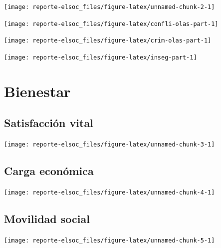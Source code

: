 \documentclass[
  12pt,
]{book}
\begin{document}
\begin{center}\texttt{[image: reporte-elsoc\_files/figure-latex/unnamed-chunk-2-1]} \end{center}

\begin{center}\texttt{[image: reporte-elsoc\_files/figure-latex/confli-olas-part-1]} \end{center}

\begin{center}\texttt{[image: reporte-elsoc\_files/figure-latex/crim-olas-part-1]} \end{center}

\begin{center}\texttt{[image: reporte-elsoc\_files/figure-latex/inseg-part-1]} \end{center}

\hypertarget{bienestar}{%
\section{Bienestar}\label{bienestar}}

\hypertarget{satisfacciuxf3n-vital}{%
\subsection{Satisfacción vital}\label{satisfacciuxf3n-vital}}

\begin{center}\texttt{[image: reporte-elsoc\_files/figure-latex/unnamed-chunk-3-1]} \end{center}

\hypertarget{carga-econuxf3mica}{%
\subsection{Carga económica}\label{carga-econuxf3mica}}

\begin{center}\texttt{[image: reporte-elsoc\_files/figure-latex/unnamed-chunk-4-1]} \end{center}

\hypertarget{movilidad-social}{%
\subsection{Movilidad social}\label{movilidad-social}}

\begin{center}\texttt{[image: reporte-elsoc\_files/figure-latex/unnamed-chunk-5-1]} \end{center}
\end{document}
